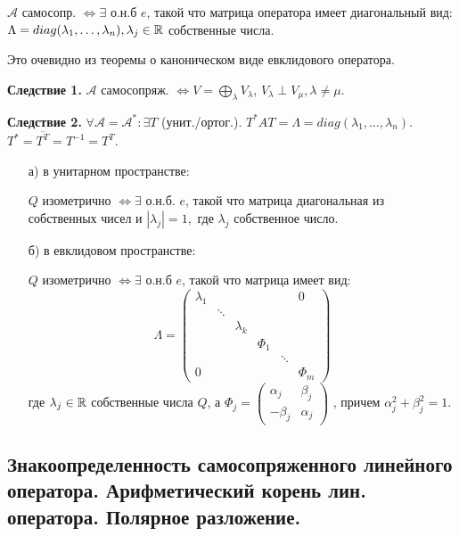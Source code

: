 $\mathcal{A}$ самосопр. $\Leftrightarrow \exists$ о.н.б $e$, такой что матрица оператора имеет  диагональный вид: $\Lambda =  diag(\lambda_1,\ldots,\lambda_n), \lambda_j\in\mathbb{R}$ собственные числа.

Это очевидно из теоремы о каноническом виде евклидового оператора.

\textbf{Следствие 1.} $\mathcal{A}$ самосопряж. $\Leftrightarrow V=\bigoplus\limits_{\lambda}V_\lambda$, $V_\lambda \perp V_\mu, \lambda \neq \mu$.

\textbf{Следствие 2.} $\forall \mathcal{A} = \mathcal{A}^*: \exists T$ (унит./ортог.). $T^* AT = \Lambda = diag(\lambda_1,\ldots, \lambda_n)$. $T^*= \overline{T^T}=T^{-1}=T^T$.


\begin{enumerate}
    \item[а)] в унитарном пространстве:

    $Q$ изометрично $\Leftrightarrow \exists$ о.н.б. $e$, такой что матрица диагональная из собственных чисел и $|\lambda_j|=1,$ где $\lambda_j$ собственное число.

      \item[б)] в евклидовом пространстве:

      $Q$ изометрично $\Leftrightarrow \exists$ о.н.б $e$, такой что матрица имеет вид:
      $$\Lambda = \begin{pmatrix}
    \lambda_1 & & & & &0\\
    & \ddots & & & &\\
    & & \lambda_k & & &\\
    & & & \Phi_1 & &\\
    & & & & \ddots & \\
    0& & & & & \Phi_m
\end{pmatrix}$$
где $\lambda_j \in \mathbb{R}$ собственные числа $Q$, а $\Phi_j = \begin{pmatrix}
    \alpha_j & \beta_j\\
    -\beta_j &\alpha_j
\end{pmatrix}$
, причем $\alpha_j^2 + \beta_j^2 = 1$.
    
\end{enumerate}

\pagebreak
\subsection{Знакоопределенность самосопряженного линейного оператора. Арифметический корень лин. оператора. Полярное разложение.}

